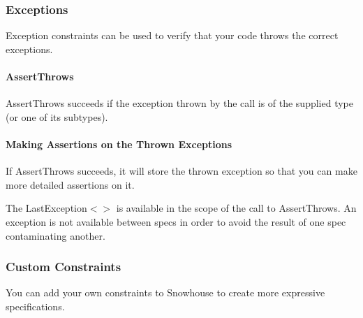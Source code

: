 \subsubsection*{Exceptions}

Exception constraints can be used to verify that your code throws the correct exceptions.

\paragraph*{Assert\+Throws}

{\ttfamily Assert\+Throws} succeeds if the exception thrown by the call is of the supplied type (or one of its subtypes).


\begin{DoxyCode}{0}
\end{DoxyCode}


\paragraph*{Making Assertions on the Thrown Exceptions}

If {\ttfamily Assert\+Throws} succeeds, it will store the thrown exception so that you can make more detailed assertions on it.


\begin{DoxyCode}{0}
\end{DoxyCode}


The {\ttfamily Last\+Exception$<$$>$} is available in the scope of the call to {\ttfamily Assert\+Throws}. An exception is not available between specs in order to avoid the result of one spec contaminating another.

\subsubsection*{Custom Constraints}

You can add your own constraints to Snowhouse to create more expressive specifications.

